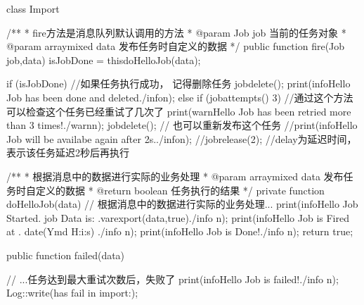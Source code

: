 \documentclass[a4paper,10pt,english]{sphinxmanual}
\begin{document}
\begin{itemize}
\begin{itemize}
\begin{sphinxVerbatim}[commandchars=\\\{\}]
class Import\PYGZob{}

    /**
     * fire方法是消息队列默认调用的方法
     * @param Job            \PYGZdl{}job      当前的任务对象
     * @param array\textbar{}mixed    \PYGZdl{}data     发布任务时自定义的数据
     */
    public function fire(Job \PYGZdl{}job,\PYGZdl{}data)\PYGZob{}
        \PYGZdl{}isJobDone = \PYGZdl{}this\PYGZhy{}\PYGZgt{}doHelloJob(\PYGZdl{}data);

        if (\PYGZdl{}isJobDone) \PYGZob{}
            //如果任务执行成功， 记得删除任务
            \PYGZdl{}job\PYGZhy{}\PYGZgt{}delete();
            print(\PYGZdq{}\PYGZlt{}info\PYGZgt{}Hello Job has been done and deleted\PYGZdq{}.\PYGZdq{}\PYGZlt{}/info\PYGZgt{}\PYGZbs{}n\PYGZdq{});
        \PYGZcb{}else\PYGZob{}
            if (\PYGZdl{}job\PYGZhy{}\PYGZgt{}attempts() \PYGZgt{} 3) \PYGZob{}
                //通过这个方法可以检查这个任务已经重试了几次了
                print(\PYGZdq{}\PYGZlt{}warn\PYGZgt{}Hello Job has been retried more than 3 times!\PYGZdq{}.\PYGZdq{}\PYGZlt{}/warn\PYGZgt{}\PYGZbs{}n\PYGZdq{});
                \PYGZdl{}job\PYGZhy{}\PYGZgt{}delete();
                // 也可以重新发布这个任务
                //print(\PYGZdq{}\PYGZlt{}info\PYGZgt{}Hello Job will be availabe again after 2s.\PYGZdq{}.\PYGZdq{}\PYGZlt{}/info\PYGZgt{}\PYGZbs{}n\PYGZdq{});
                //\PYGZdl{}job\PYGZhy{}\PYGZgt{}release(2); //\PYGZdl{}delay为延迟时间，表示该任务延迟2秒后再执行
            \PYGZcb{}
        \PYGZcb{}
    \PYGZcb{}

    /**
     * 根据消息中的数据进行实际的业务处理
     * @param array\textbar{}mixed    \PYGZdl{}data     发布任务时自定义的数据
     * @return boolean                 任务执行的结果
     */
    private function doHelloJob(\PYGZdl{}data) \PYGZob{}
        // 根据消息中的数据进行实际的业务处理...
        print(\PYGZdq{}\PYGZlt{}info\PYGZgt{}Hello Job Started. job Data is: \PYGZdq{}.var\PYGZus{}export(\PYGZdl{}data,true).\PYGZdq{}\PYGZlt{}/info\PYGZgt{} \PYGZbs{}n\PYGZdq{});
        print(\PYGZdq{}\PYGZlt{}info\PYGZgt{}Hello Job is Fired at \PYGZdq{} . date(\PYGZsq{}Y\PYGZhy{}m\PYGZhy{}d H:i:s\PYGZsq{}) .\PYGZdq{}\PYGZlt{}/info\PYGZgt{} \PYGZbs{}n\PYGZdq{});
        print(\PYGZdq{}\PYGZlt{}info\PYGZgt{}Hello Job is Done!\PYGZdq{}.\PYGZdq{}\PYGZlt{}/info\PYGZgt{} \PYGZbs{}n\PYGZdq{});
        return true;
    \PYGZcb{}

    public function failed(\PYGZdl{}data)\PYGZob{}

        // ...任务达到最大重试次数后，失败了
        print(\PYGZdq{}\PYGZlt{}info\PYGZgt{}Hello Job is failed!\PYGZdq{}.\PYGZdq{}\PYGZlt{}/info\PYGZgt{} \PYGZbs{}n\PYGZdq{});
        Log::write(\PYGZdq{}has fail in import:\PYGZdq{});
    \PYGZcb{}
\PYGZcb{}
\end{sphinxVerbatim}


\end{itemize}
\end{itemize}
\end{document}
